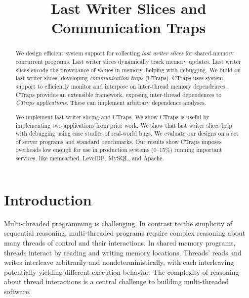 \documentclass[preprint,9pt]{sigplanconf}
\title{\Large Last Writer Slices and Communication Traps}
\newcommand{\ctraps}{CTraps\xspace}
\begin{document}
\maketitle

\begin{abstract}

We design efficient system support for collecting {\em last writer slices} for
shared-memory concurrent programs.  Last writer slices dynamically track memory
updates.  Last writer slices encode the provenance of values in memory, helping
with debugging.   We build on last writer slices, developing {\em communication
traps} (\ctraps).  \ctraps uses system support to efficiently monitor and
interpose on inter-thread memory dependences.  \ctraps provides an extensible
framework, exposing inter-thread dependences to {\em \ctraps applications}.
These can implement arbitrary dependence analyses.  

We implement last writer slicing and \ctraps.  We show \ctraps is useful by
implementing two applications from prior work. We show that last writer slices
help with debugging using case studies of real-world bugs.  We evaluate our
designs on a set of server programs and standard benchmarks.  Our results show
\ctraps imposes overheads low enough for use in production systems (0--15\%)
running important services, like memcached, LevelDB, MySQL, and Apache.

\end{abstract}

\section{Introduction}
Multi-threaded programming is challenging.  In contrast to the simplicity of
sequential reasoning, multi-threaded programs require complex reasoning about
many threads of control and their interactions.  In shared memory programs,
threads interact by reading and writing memory locations.  Threads' reads and
writes interleave arbitrarily and nondeterministically, with each interleaving
potentially yielding different execution behavior.  The complexity of reasoning
about thread interactions is a central challenge to building multi-threaded
software.  
\end{document}
